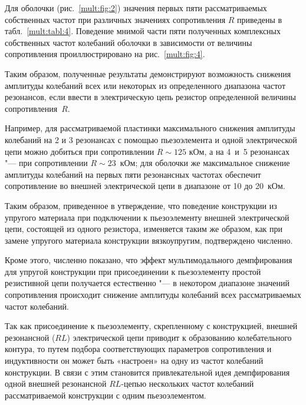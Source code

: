 Для оболочки (рис.~\ref{mult:fig:2}) значения первых пяти рассматриваемых собственных частот при различных значениях сопротивления $R$ приведены в табл.~\ref{mult:tabl:4}. Поведение мнимой части пяти полученных комплексных собственных частот колебаний оболочки в зависимости от величины сопротивления проиллюстрировано на рис.~\ref{mult:fig:4}.



Таким образом, полученные результаты демонстрируют возможность снижения амплитуды колебаний всех или некоторых из определенного диапазона частот резонансов, если ввести в электрическую цепь резистор определенной величины сопротивления~$R$.



Например, для рассматриваемой пластинки максимального снижения амплитуды колебаний на 2 и 3 резонансах с помощью пьезоэлемента и одной электрической цепи можно добиться при сопротивлении $R\sim 125$ кОм, а на 4~и~5 резонансах "--- при сопротивлении $R\sim 23$~кОм; для оболочки же максимальное снижение амплитуды колебаний на первых пяти резонансных частотах обеспечит сопротивление во внешней электрической цепи в диапазоне от 10 до 20~кОм.



Таким образом, приведенное в \cite{mult:Ref1} утверждение, что поведение конструкции из упругого материала при подключении к пьезоэлементу внешней электрической цепи, состоящей из одного резистора, изменяется таким же образом, как при замене упругого материала конструкции вязкоупругим, подтверждено численно.



Кроме этого, численно показано, что эффект мультимодального демпфирования для упругой конструкции при присоединении к пьезоэлементу простой резистивной цепи получается естественно "--- в некотором диапазоне значений сопротивления происходит снижение амплитуды колебаний всех рассматриваемых частот колебаний.



\smallskip




Так как присоединение к пьезоэлементу, скрепленному с конструкцией, внешней резонансной ($RL$) электрической цепи приводит к образованию колебательного контура, то путем подбора соответствующих параметров сопротивления и индуктивности он может быть «настроен» на одну из частот колебаний конструкции. В связи с этим становится привлекательной идея демпфирования одной внешней резонансной $RL$-цепью нескольких частот колебаний рассматриваемой конструкции с одним пьезоэлементом.



